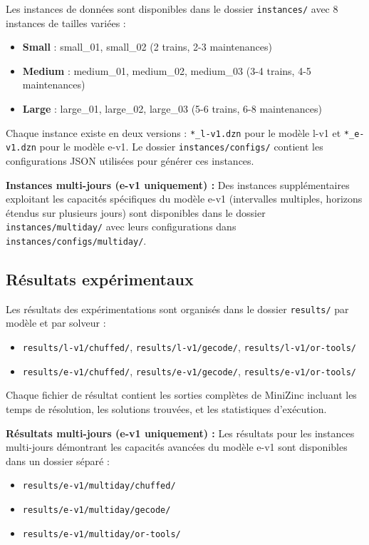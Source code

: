 Les instances de données sont disponibles dans le dossier \texttt{instances/} avec 8 instances de tailles variées :
\begin{itemize}
	\item \textbf{Small} : small\_01, small\_02 (2 trains, 2-3 maintenances)
	\item \textbf{Medium} : medium\_01, medium\_02, medium\_03 (3-4 trains, 4-5 maintenances)
	\item \textbf{Large} : large\_01, large\_02, large\_03 (5-6 trains, 6-8 maintenances)
\end{itemize}

Chaque instance existe en deux versions : \texttt{*\_l-v1.dzn} pour le modèle l-v1 et \texttt{*\_e-v1.dzn} pour le modèle e-v1. Le dossier \texttt{instances/configs/} contient les configurations JSON utilisées pour générer ces instances.

\textbf{Instances multi-jours (e-v1 uniquement) :} Des instances supplémentaires exploitant les capacités spécifiques du modèle e-v1 (intervalles multiples, horizons étendus sur plusieurs jours) sont disponibles dans le dossier \texttt{instances/multiday/} avec leurs configurations dans \texttt{instances/configs/multiday/}.

\subsection{Résultats expérimentaux}

Les résultats des expérimentations sont organisés dans le dossier \texttt{results/} par modèle et par solveur :
\begin{itemize}
	\item \texttt{results/l-v1/chuffed/}, \texttt{results/l-v1/gecode/}, \texttt{results/l-v1/or-tools/}
	\item \texttt{results/e-v1/chuffed/}, \texttt{results/e-v1/gecode/}, \texttt{results/e-v1/or-tools/}
\end{itemize}

Chaque fichier de résultat contient les sorties complètes de MiniZinc incluant les temps de résolution, les solutions trouvées, et les statistiques d'exécution.

\textbf{Résultats multi-jours (e-v1 uniquement) :} Les résultats pour les instances multi-jours démontrant les capacités avancées du modèle e-v1 sont disponibles dans un dossier séparé :
\begin{itemize}
	\item \texttt{results/e-v1/multiday/chuffed/}
	\item \texttt{results/e-v1/multiday/gecode/}
	\item \texttt{results/e-v1/multiday/or-tools/}
\end{itemize}
